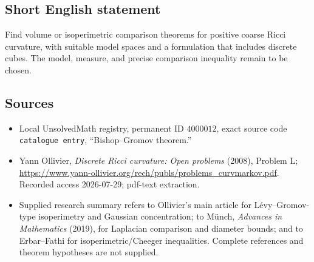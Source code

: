 \documentclass[11pt]{article}
\begin{document}
\subsection{Short English statement}
Find volume or isoperimetric comparison theorems for positive coarse Ricci curvature, with suitable model spaces and a formulation that includes discrete cubes. The model, measure, and precise comparison inequality remain to be chosen.
\subsection{Sources}
\begin{itemize}
\item Local UnsolvedMath registry, permanent ID \(4000012\), exact source code \texttt{catalogue entry}, ``Bishop--Gromov theorem.''
\item Yann Ollivier, \emph{Discrete Ricci curvature: Open problems} (2008), Problem L; \url{https://www.yann-ollivier.org/rech/publs/problems_curvmarkov.pdf}. Recorded access 2026-07-29; pdf-text extraction.
\item Supplied research summary refers to Ollivier's main article for Lévy--Gromov-type isoperimetry and Gaussian concentration; to Münch, \emph{Advances in Mathematics} (2019), for Laplacian comparison and diameter bounds; and to Erbar--Fathi for isoperimetric/Cheeger inequalities. Complete references and theorem hypotheses are not supplied.
\end{itemize}
\end{document}
